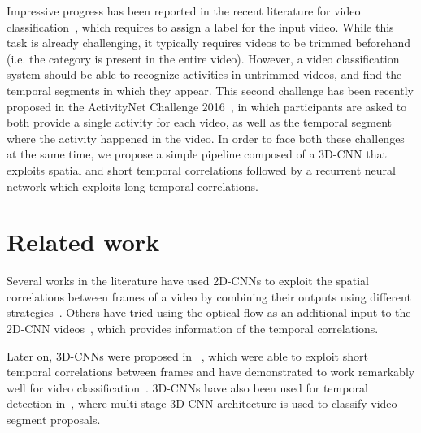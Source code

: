 \documentclass{article}
\begin{document}
Impressive progress has been reported in the recent literature for video classification~\cite{tran2014learning,tran2015deep,wang2015towards,yao2015describing}, which requires to assign a label for the input video. While this task is already challenging, it typically requires videos to be trimmed beforehand (i.e. the category is present in the entire video).
However, a video classification system should be able to recognize activities in untrimmed videos, and find the temporal segments in which they appear.
This second challenge has been recently proposed in the ActivityNet Challenge 2016~\cite{caba2015activitynet}, in which participants are asked to both provide a single activity for each video, as well as the temporal segment where the activity happened in the video.
In order to face both these challenges at the same time, we propose a simple pipeline composed of a 3D-CNN that exploits spatial and short temporal correlations followed by a recurrent neural network which exploits long temporal correlations.


\section{Related work}


Several works in the literature have used 2D-CNNs to exploit the spatial correlations between frames of a video by combining their outputs using different strategies~\cite{gkioxari2015contextual,yeung2015end,ballas2015delving}. Others have tried using the optical flow as an additional input to the 2D-CNN videos~\cite{wang2015towards}, which provides information of the temporal correlations. %

Later on, 3D-CNNs were proposed in ~\cite{tran2014learning}, which were able to exploit short temporal correlations between frames and have demonstrated to work remarkably well for video classification~\cite{tran2014learning,tran2015deep}. 3D-CNNs have also been used for temporal detection in~\cite{shoutemporal}, where multi-stage 3D-CNN architecture is used to classify video segment proposals.
\end{document}
